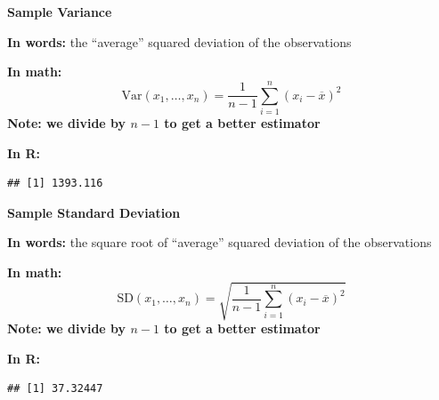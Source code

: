 \documentclass[ignorenonframetext,]{beamer}
\newenvironment{Shaded}{\begin{snugshade}}{\end{snugshade}}
\newcommand{\KeywordTok}[1]{\textcolor[rgb]{0.13,0.29,0.53}{\textbf{#1}}}
\newcommand{\NormalTok}[1]{#1}
\newcommand{\OperatorTok}[1]{\textcolor[rgb]{0.81,0.36,0.00}{\textbf{#1}}}
\begin{document}
\begin{frame}[fragile]{}
\protect\hypertarget{section-46}{}

\textbf{\large Sample Variance}

\vspace{2ex}

\textbf{In words:} the ``average'' squared deviation of the observations

\vspace{2ex}

\textbf{In math:}
\[\textrm{Var}(x_1,\ldots, x_n)=\frac{1}{n-1}\sum_{i=1}^n(x_i-\overline{x})^2\]
\hfill\textbf{\color{coralred} Note: we divide by $n-1$ to get a better estimator}

\vspace{2ex}

\textbf{In R:}

\vspace{1ex}\scriptsize

\begin{Shaded}
\end{Shaded}

\begin{verbatim}
## [1] 1393.116
\end{verbatim}

\end{frame}

\begin{frame}[fragile]{}
\protect\hypertarget{section-47}{}

\textbf{\large Sample Standard Deviation}

\vspace{2ex}

\textbf{In words:} the square root of ``average'' squared deviation of
the observations

\vspace{2ex}

\textbf{In math:}
\[\textrm{SD}(x_1,\ldots, x_n)=\sqrt{\frac{1}{n-1}\sum_{i=1}^n(x_i-\overline{x})^2}\]
\hfill\textbf{\color{coralred} Note: we divide by $n-1$ to get a better estimator}

\vspace{2ex}

\textbf{In R:}

\vspace{1ex}\scriptsize

\begin{Shaded}
\end{Shaded}

\begin{verbatim}
## [1] 37.32447
\end{verbatim}

\end{frame}
\end{document}
